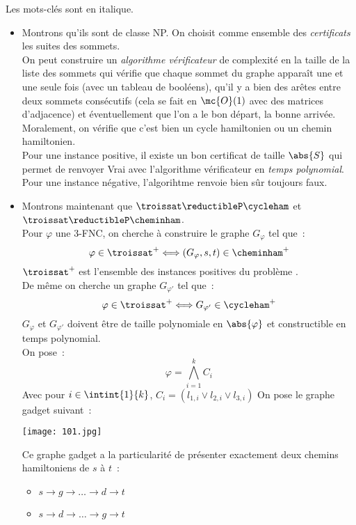 \begin{demonstration}
    Les mots-clés sont en italique.
    \begin{itemize}
        \item Montrons qu'ils sont de classe NP. On choisit comme ensemble des \textit{certificats} les suites des sommets.\\
        On peut construire un \textit{algorithme vérificateur} de complexité en la taille de la liste des sommets qui vérifie que chaque sommet du graphe apparaît une et une seule fois (avec un tableau de booléens), qu'il y a bien des arêtes entre deux sommets consécutifs (cela se fait en $\mc{O}(1)$ avec des matrices d'adjacence) et éventuellement que l'on a le bon départ, la bonne arrivée.\\
        Moralement, on vérifie que c'est bien un cycle hamiltonien ou un chemin hamiltonien.\\
        Pour une instance positive, il existe un bon certificat de taille $\abs{S}$ qui permet de renvoyer Vrai avec l'algorithme vérificateur en \textit{temps polynomial}.\\
        Pour une instance négative, l'algorihtme renvoie bien sûr toujours faux.
        \item Montrons maintenant que $\troissat \reductibleP \cycleham$ et $\troissat \reductibleP \cheminham$.\\
        Pour $\varphi$ une 3-FNC, on cherche à construire le graphe $G_\varphi$ tel que~:
        $$\varphi \in \troissat^+ \Longleftrightarrow (G_\varphi,s,t) \in \cheminham^+$$
        $\troissat^+$ est l'ensemble des instances positives du problème \troissat. \\
        De même on cherche un graphe $G_{\varphi'}$ tel que~:
        $$\varphi \in \troissat^+ \Longleftrightarrow G_{\varphi'} \in \cycleham^+$$
        $G_\varphi$ et $G_{\varphi'}$ doivent être de taille polynomiale en $\abs{\varphi}$ et constructible en temps polynomial.\\
        On pose~:
            $$\varphi = \bigwedge_{i=1}^kC_i$$
        Avec pour $i \in \intint{1}{k}$, $C_i = (l_{1,i} \vee l_{2,i} \vee l_{3,i})$
        On pose le graphe gadget suivant~:
        \begin{center}
            \texttt{[image: 101.jpg]}
        \end{center}
        Ce graphe gadget a la particularité de présenter exactement deux chemins hamiltoniens de $s$ à $t$~:
        \begin{itemize}
            \item $s \rightarrow g \rightarrow \dots \rightarrow d \rightarrow t$
            \item $s \rightarrow d \rightarrow \dots \rightarrow g \rightarrow t$
        \end{itemize}
    \end{itemize}
\end{demonstration}

